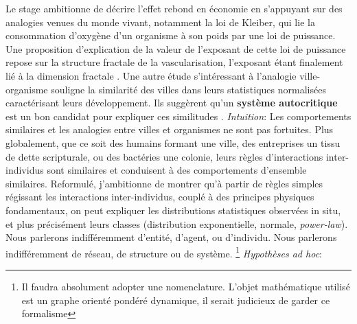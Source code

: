 \documentclass[10pt,a4paper]{article}
\begin{document}
Le stage ambitionne de décrire l'effet rebond en économie en s'appuyant sur des analogies venues du monde vivant, notamment la loi de Kleiber, qui lie la consommation d'oxygène d'un organisme à son poids par une loi de puissance. 
Une proposition d'explication de la valeur de l'exposant de cette loi de puissance repose sur la structure fractale de la vascularisation, l'exposant étant finalement lié à la dimension fractale \cite{west1997}. 
Une autre étude s’intéressant à l'analogie ville-organisme souligne la similarité des villes dans leurs statistiques normalisées caractérisant leurs développement. Ils suggèrent qu'un \textbf{système autocritique} est un bon candidat pour expliquer ces similitudes \cite{hendrick2025}. 
\newline
\textit{Intuition}: Les comportements similaires et les analogies entre villes et organismes ne sont pas fortuites. Plus globalement, que ce soit des humains formant une ville, des entreprises un tissu de dette scripturale, ou des bactéries une colonie, leurs règles d’interactions inter-individus sont similaires et conduisent à des comportements d'ensemble similaires. Reformulé, j'ambitionne de montrer qu'à partir de règles simples régissant les interactions inter-individus, couplé à des principes physiques fondamentaux, on peut expliquer les distributions statistiques observées in situ, et plus précisément leurs classes (distribution exponentielle, normale, \textit{power-law}). Nous parlerons indifféremment d'entité, d'agent, ou d'individu. Nous parlerons indifféremment de réseau, de structure ou de système. \footnote{Il faudra absolument adopter une nomenclature. L'objet mathématique utilisé est un graphe orienté pondéré dynamique, il serait judicieux de garder ce formalisme}
\newline
\textit{Hypothèses ad hoc}:  
\end{document}
